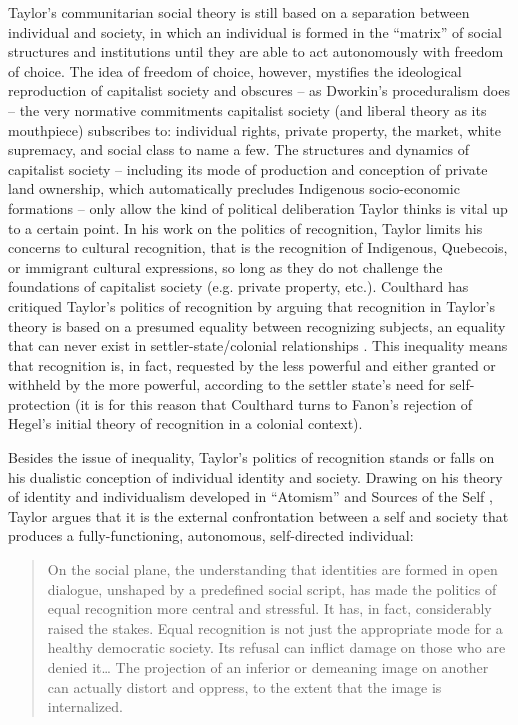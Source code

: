 \documentclass[12pt,oneside]{memoir}
\begin{document}
Taylor's communitarian social theory is still based on a separation between individual and society, in which an individual is formed in the ``matrix'' of social structures and institutions until they are able to act autonomously with freedom of choice. The idea of freedom of choice, however, mystifies the ideological reproduction of capitalist society and obscures -- as Dworkin's proceduralism does -- the very normative commitments capitalist society (and liberal theory as its mouthpiece) subscribes to: individual rights, private property, the market, white supremacy, and social class to name a few. The structures and dynamics of capitalist society -- including its mode of production and conception of private land ownership, which automatically precludes Indigenous socio-economic formations -- only allow the kind of political deliberation Taylor thinks is vital up to a certain point. In his work on the politics of recognition, Taylor limits his concerns to cultural recognition, that is the recognition of Indigenous, Quebecois, or immigrant cultural expressions, so long as they do not challenge the foundations of capitalist society (e.g. private property, etc.). Coulthard has critiqued Taylor's politics of recognition by arguing that recognition in Taylor's theory is based on a presumed equality between recognizing subjects, an equality that can never exist in settler-state/colonial relationships \citep{Coulthard2014}. This inequality means that recognition is, in fact, requested by the less powerful and either granted or withheld by the more powerful, according to the settler state's need for self-protection (it is for this reason that Coulthard turns to Fanon's rejection of Hegel's initial theory of recognition in a colonial context).

	Besides the issue of inequality, Taylor's politics of recognition stands or falls on his dualistic conception of individual identity and society. Drawing on his theory of identity and individualism developed in ``Atomism'' and Sources of the Self \citep{Taylor1989}, Taylor argues that it is the external confrontation between a self and society that produces a fully-functioning, autonomous, self-directed individual:

\begin{quote}

On the social plane, the understanding that identities are formed in open dialogue, unshaped by a predefined social script, has made the politics of equal recognition more central and stressful. It has, in fact, considerably raised the stakes. Equal recognition is not just the appropriate mode for a healthy democratic society. Its refusal can inflict damage on those who are denied it{\ldots} The projection of an inferior or demeaning image on another can actually distort and oppress, to the extent that the image is internalized. \cite[36]{Taylor1994}
\end{quote}
\end{document}

